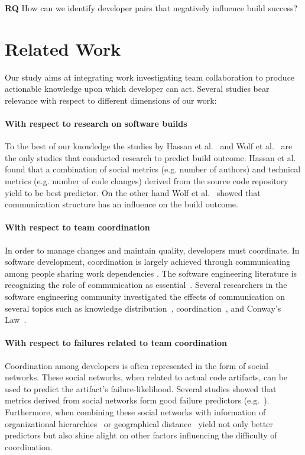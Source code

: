 \documentclass[conference]{IEEEtran}
\begin{document}
\textbf{RQ} How can we identify developer pairs that negatively influence build success?
 

\section{Related Work}
\label{sec:relwork}
Our study aims at integrating work investigating team collaboration to produce actionable knowledge upon which developer can act.
Several studies bear relevance with respect to different dimensions of our work:

\paragraph{With respect to research on software builds}
To the best of our knowledge the studies by Hassan et al.~\cite{hassan:ase:2006}
and Wolf et al.~\cite{wolf:icse:2009} are the only studies that conducted
research to predict build outcome. Hassan et al.~\cite{hassan:ase:2006} found
that a combination of social metrics (e.g. number of authors) and technical
metrics (e.g. number of code changes) derived from the source code repository
yield to be best predictor. 
On the other hand Wolf et al.~\cite{wolf:icse:2009} showed that communication structure has an influence on the build outcome.

\paragraph{With respect to team coordination}
In order to manage changes and maintain quality, developers must coordinate. In
software development, coordination is largely achieved through communicating among
people sharing work dependencies \cite{kraut1995:coordination}. The
software engineering literature is recognizing the role of communication as essential~\cite{nakakoji2010:rdc}.
Several researchers in the software engineering community investigated the effects of communication on several topics such as knowledge distribution~\cite{ehrlich:icgse:2006}, coordination~\cite{hinds:cscw:2006}, and Conway's Law~\cite{cataldo:cscw:2006}.


\paragraph{With respect to failures related to team coordination}
Coordination among developers is often represented in the form of social networks.
These social networks, when related to actual code artifacts, can be used to predict the artifact's failure-likelihood.
Several studies showed that metrics derived from social networks form good failure predictors (e.g.~\cite{meneely:fse:2008}).
Furthermore, when combining these social networks with information of organizational hierarchies~\cite{nagappan:icse:2008} or geographical distance~\cite{bird:acm:2009} yield not only better predictors but also shine alight on other factors influencing the difficulty of coordination.
\end{document}

